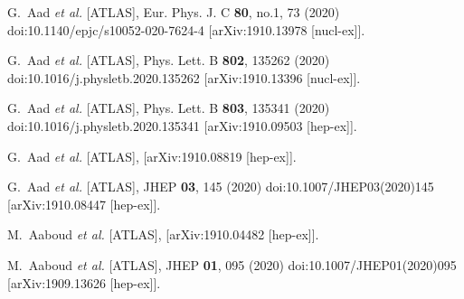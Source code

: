 \begin{thebibliography}{9}
G.~Aad \textit{et al.} [ATLAS],
Eur. Phys. J. C \textbf{80}, no.1, 73 (2020)
doi:10.1140/epjc/s10052-020-7624-4
[arXiv:1910.13978 [nucl-ex]].

G.~Aad \textit{et al.} [ATLAS],
Phys. Lett. B \textbf{802}, 135262 (2020)
doi:10.1016/j.physletb.2020.135262
[arXiv:1910.13396 [nucl-ex]].

G.~Aad \textit{et al.} [ATLAS],
Phys. Lett. B \textbf{803}, 135341 (2020)
doi:10.1016/j.physletb.2020.135341
[arXiv:1910.09503 [hep-ex]].

G.~Aad \textit{et al.} [ATLAS],
[arXiv:1910.08819 [hep-ex]].

G.~Aad \textit{et al.} [ATLAS],
JHEP \textbf{03}, 145 (2020)
doi:10.1007/JHEP03(2020)145
[arXiv:1910.08447 [hep-ex]].

M.~Aaboud \textit{et al.} [ATLAS],
[arXiv:1910.04482 [hep-ex]].

M.~Aaboud \textit{et al.} [ATLAS],
JHEP \textbf{01}, 095 (2020)
doi:10.1007/JHEP01(2020)095
[arXiv:1909.13626 [hep-ex]].


\end{thebibliography}
